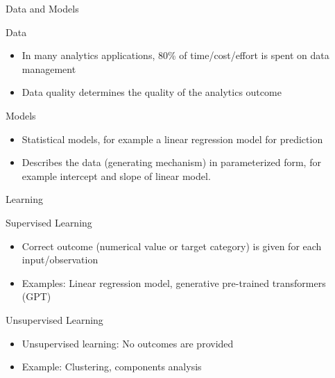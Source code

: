 \documentclass[ignorenonframetext,xcolor=dvipsnames]{beamer}
\begin{document}
\begin{frame}[label=full]{Data and Models}
\begin{block}{Data}
\begin{itemize}
	\item In many analytics applications, 80\% of time/cost/effort is spent on data management
	\item Data quality determines the quality of the analytics outcome
\end{itemize}
\end{block}
\begin{block}{Models}
\begin{itemize}
	\item Statistical models, for example a linear regression model for prediction
	\item Describes the data (generating mechanism) in parameterized form, for example intercept and slope of linear model.
\end{itemize}
\end{block}
\end{frame}

\begin{frame}[label=full]{Learning}
\begin{block}{Supervised Learning}
\begin{itemize}
	\item Correct outcome (numerical value or target category) is given for each input/observation
	\item Examples: Linear regression model, generative pre-trained transformers (GPT)
\end{itemize}
\end{block}
\begin{block}{Unsupervised Learning}
\begin{itemize}
	\item Unsupervised learning: No outcomes are provided
	\item Example: Clustering, components analysis
\end{itemize}
\end{block}
\end{frame}
\end{document}
